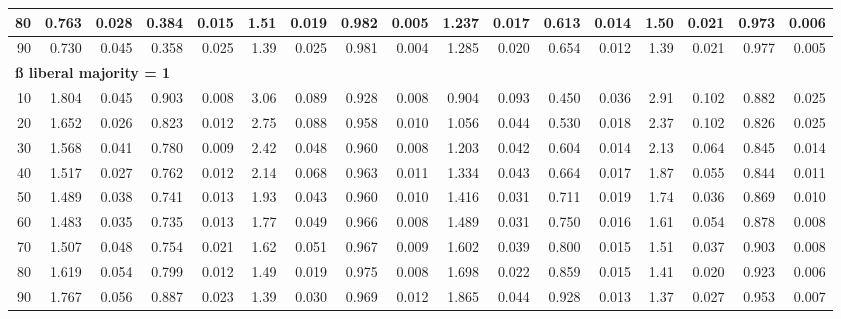 \documentclass[
]{article}
\begin{document}
\begin{table}[H]
\begin{table}
{\begin{tabular}{r|r|r|r|r|r|r|r|r|r|r|r|r|r|r|r|r}
\hline
\hspace{1em}80 & 0.763 & 0.028 & 0.384 & 0.015 & 1.51 & 0.019 & 0.982 & 0.005 & 1.237 & 0.017 & 0.613 & 0.014 & 1.50 & 0.021 & 0.973 & 0.006\\
\hline
\hspace{1em}90 & 0.730 & 0.045 & 0.358 & 0.025 & 1.39 & 0.025 & 0.981 & 0.004 & 1.285 & 0.020 & 0.654 & 0.012 & 1.39 & 0.021 & 0.977 & 0.005\\
\hline
\multicolumn{17}{l}{\textbf{ß liberal majority = 1}}\\
\hline
\hspace{1em}10 & 1.804 & 0.045 & 0.903 & 0.008 & 3.06 & 0.089 & 0.928 & 0.008 & 0.904 & 0.093 & 0.450 & 0.036 & 2.91 & 0.102 & 0.882 & 0.025\\
\hline
\hspace{1em}20 & 1.652 & 0.026 & 0.823 & 0.012 & 2.75 & 0.088 & 0.958 & 0.010 & 1.056 & 0.044 & 0.530 & 0.018 & 2.37 & 0.102 & 0.826 & 0.025\\
\hline
\hspace{1em}30 & 1.568 & 0.041 & 0.780 & 0.009 & 2.42 & 0.048 & 0.960 & 0.008 & 1.203 & 0.042 & 0.604 & 0.014 & 2.13 & 0.064 & 0.845 & 0.014\\
\hline
\hspace{1em}40 & 1.517 & 0.027 & 0.762 & 0.012 & 2.14 & 0.068 & 0.963 & 0.011 & 1.334 & 0.043 & 0.664 & 0.017 & 1.87 & 0.055 & 0.844 & 0.011\\
\hline
\hspace{1em}50 & 1.489 & 0.038 & 0.741 & 0.013 & 1.93 & 0.043 & 0.960 & 0.010 & 1.416 & 0.031 & 0.711 & 0.019 & 1.74 & 0.036 & 0.869 & 0.010\\
\hline
\hspace{1em}60 & 1.483 & 0.035 & 0.735 & 0.013 & 1.77 & 0.049 & 0.966 & 0.008 & 1.489 & 0.031 & 0.750 & 0.016 & 1.61 & 0.054 & 0.878 & 0.008\\
\hline
\hspace{1em}70 & 1.507 & 0.048 & 0.754 & 0.021 & 1.62 & 0.051 & 0.967 & 0.009 & 1.602 & 0.039 & 0.800 & 0.015 & 1.51 & 0.037 & 0.903 & 0.008\\
\hline
\hspace{1em}80 & 1.619 & 0.054 & 0.799 & 0.012 & 1.49 & 0.019 & 0.975 & 0.008 & 1.698 & 0.022 & 0.859 & 0.015 & 1.41 & 0.020 & 0.923 & 0.006\\
\hline
\hspace{1em}90 & 1.767 & 0.056 & 0.887 & 0.023 & 1.39 & 0.030 & 0.969 & 0.012 & 1.865 & 0.044 & 0.928 & 0.013 & 1.37 & 0.027 & 0.953 & 0.007\\

\end{tabular}}
\end{table}
\end{table}
\end{document}
